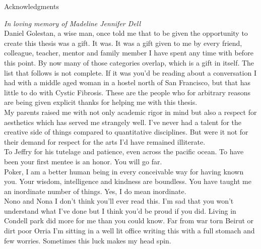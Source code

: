 \newpage

\vspace{3in}

\begin{center}
\begin{Large}
\begin{bfseries}
Acknowledgments
\end{bfseries}
\end{Large}
\end{center}

\vspace{0.5in}


\vspace{1.0in}
\textit {In loving memory of Madeline Jennifer Dell} \\

 Daniel Golestan, a wise man, once told me that to be given the opportunity to create this thesis was a gift. It was. It was a gift given to me by every friend, colleague, teacher, mentor and family member I have spent any time with before this point. By now many of those categories overlap, which is a gift in itself. The list that follows is not complete. If it was you'd be reading about a conversation I had with a middle aged woman in a hostel north of San Francisco, but that has little to do with Cystic Fibrosis. These are the people who for arbitrary reasons are being given explicit thanks for helping me with this thesis. \\

My parents raised me with not only academic rigor in mind but also a respect for aesthetics which has served me strangely well. I've never had a talent for the creative side of things compared to quantitative disciplines. But were it not for their demand for respect for the arts I'd have remained illiterate. \\

To Jeffry for his tutelage and patience, even across the pacific ocean. To have been your first mentee is an honor. You will go far. \\

Poker, I am a better human being in every conceivable way for having known you. Your wisdom, intelligence and kindness are boundless. You have taught me an inordinate number of things. Yes, I do mean inordinate. \\

Nono and Nona I don't think you'll ever read this. I'm sad that you won't understand what I've done but I think you'd be proud if you did. Living in Condell park did more for me than you could know. Far from war torn Beirut or dirt poor Orria I'm sitting in a well lit office writing this with a full stomach and few worries. Sometimes this luck makes my head spin. \\


